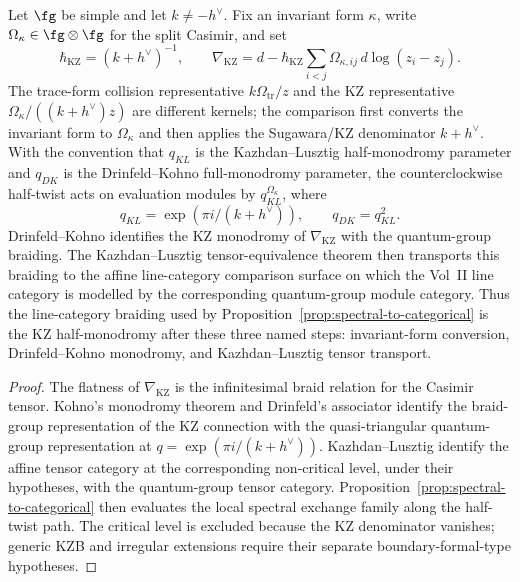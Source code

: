 \begin{proposition}
\label{prop:kz-dk-kl-line-braiding-proof-path}
Let \(\fg\) be simple and let \(k\ne -h^\vee\).  Fix an invariant form
\(\kappa\), write \(\Omega_\kappa\in\fg\otimes\fg\) for the split
Casimir, and set
\[
\hbar_{\mathrm{KZ}}=(k+h^\vee)^{-1},\qquad
\nabla_{\mathrm{KZ}}
=d-\hbar_{\mathrm{KZ}}
\sum_{i<j}\Omega_{\kappa,ij}\,d\log(z_i-z_j).
\]
The trace-form collision representative \(k\Omega_{\mathrm{tr}}/z\)
and the KZ representative \(\Omega_\kappa/((k+h^\vee)z)\) are
different kernels; the comparison first converts the invariant form to
\(\Omega_\kappa\) and then applies the Sugawara/KZ denominator
\(k+h^\vee\).  With the convention that \(q_{KL}\) is the
Kazhdan--Lusztig half-monodromy parameter and \(q_{DK}\) is the
Drinfeld--Kohno full-monodromy parameter, the counterclockwise
half-twist acts on evaluation modules by \(q_{KL}^{\Omega_\kappa}\),
where
\[
q_{KL}=\exp(\pi i/(k+h^\vee)),\qquad
q_{DK}=q_{KL}^{2}.
\]
Drinfeld--Kohno identifies the KZ monodromy of
\(\nabla_{\mathrm{KZ}}\) with the quantum-group braiding.  The
Kazhdan--Lusztig tensor-equivalence theorem then transports this
braiding to the affine line-category comparison surface on which the
Vol~II line category is modelled by the corresponding quantum-group
module category.  Thus the line-category braiding used by
Proposition~\ref{prop:spectral-to-categorical} is the KZ
half-monodromy after these three named steps: invariant-form
conversion, Drinfeld--Kohno monodromy, and Kazhdan--Lusztig tensor
transport.
\end{proposition}

\begin{proof}
The flatness of \(\nabla_{\mathrm{KZ}}\) is the infinitesimal braid
relation for the Casimir tensor.  Kohno's monodromy theorem
\cite{Kohno87} and Drinfeld's associator \cite{Drinfeld90}
identify the braid-group representation of the KZ connection with the
quasi-triangular quantum-group representation at
\(q=\exp(\pi i/(k+h^\vee))\).  Kazhdan--Lusztig \cite{KL93}
identify the affine tensor category at the corresponding
non-critical level, under their hypotheses, with the quantum-group
tensor category.  Proposition~\ref{prop:spectral-to-categorical}
then evaluates the local spectral exchange family along the half-twist
path.  The critical level is excluded because the KZ denominator
vanishes; generic KZB and irregular extensions require their separate
boundary-formal-type hypotheses.
\end{proof}

